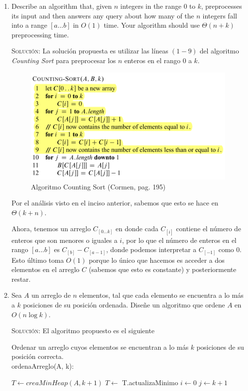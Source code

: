 \documentclass[letterpaper,11pt]{article}
\begin{document}
\begin{enumerate}
\begin{proof}
    \end{proof}

    \item Describe an algorithm that, given $n$ integers in the range $0$ to 
    $k$, preprocesses its input and then answers any query about how many of 
    the $n$ integers fall into a range $[a ... b]$ in $O(1)$ time. Your 
    algorithm should use $\Theta(n + k)$ preprocessing time.

    \textsc{Solución:} La solución propuesta es utilizar las líneas $(1 - 9)$
    del algoritmo \textit{Counting Sort} para preprocesar los $n$ enteros en 
    el rango $0$ a $k$.

    \begin{figure}[h]
        \centering
        \includegraphics[width=0.5\linewidth]{imagenes/counting-sort.png}
        \caption{Algoritmo Counting Sort (Cormen, pag. 195)}
        \label{fig:counting-sort}
    \end{figure}

    Por el análisis visto en el inciso anterior, sabemos que esto se hace en 
    $\Theta(k + n)$. 

    Ahora, tenemos un arreglo $C_{[0...k]}$ en donde cada $C_{[i]}$ contiene el 
    número de enteros que son menores o iguales a $i$, por lo que el número de 
    enteros en el rango $[a...b]$ es $C_{[b]} - C_{[a-1]}$, donde podemos 
    interpretar a $C_{[-1]}$ como $0$. Esto último toma $O(1)$ porque lo único 
    que hacemos es acceder a dos elementos en el arreglo $C$ (sabemos que esto 
    es constante) y posteriormente restar. 

    \item Sea $A$ un arreglo de $n$ elementos, tal que cada elemento se 
    encuentra a lo más a $k$ posiciones de su posición ordenada. Diseñe un 
    algoritmo que ordene $A$ en $O(n \log k)$.

    \textsc{Solución:} El algoritmo propuesto es el siguiente 
    \begin{center}
        \begin{minipage}[c]{0.75\textwidth}
        \begin{algorithm}[H]
            \caption{Ordenar un arreglo cuyos elementos se encuentran a lo más 
                     $k$ posiciones de su posición correcta. \\ 
                     ordenaArreglo(A, k):} 
            \begin{algorithmic}[1]
                \State $T \gets creaMinHeap(A, k+1)$
                \State $T \gets$ T.actualizaMinimo
                \State $i \gets 0$
                \State $j \gets k + 1$


\end{algorithmic}
\end{algorithm}
\end{minipage}
\end{center}
\end{enumerate}
\end{document}
